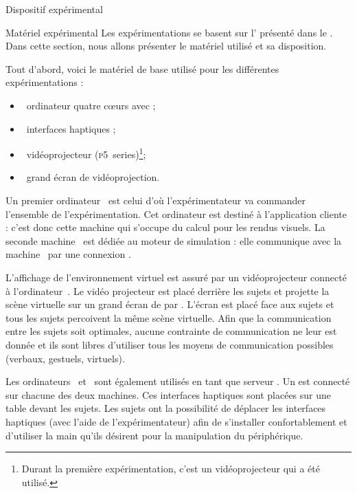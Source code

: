 \documentclass[myfrancais]{mythesis}
\begin{document}
	\myglossary
	\myappendix
	\begin{mychapter}{Dispositif expérimental}
		\begin{mysection}{Matériel expérimental}
			Les expérimentations se basent sur l' présenté dans le .
			Dans cette section, nous allons présenter le matériel utilisé et sa disposition.

			Tout d'abord, voici le matériel de base utilisé pour les différentes expérimentations :
			\begin{itemize}
				\item {}~ordinateur quatre cœurs \myIntelCore avec ;
				\item {}~interfaces haptiques \myOmni;
				\item {}~vidéoprojecteur \myACER (\textsc{p5}~series)\footnote{Durant la première expérimentation, c'est un vidéoprojecteur \myCasioXJ qui a été utilisé.};
				\item {}~grand écran de vidéoprojection.
			\end{itemize}

			Un premier ordinateur~ est celui d'où l'expérimentateur va commander l'ensemble de l'expérimentation.
			Cet ordinateur est destiné à l'application cliente  : c'est donc cette machine qui s'occupe du calcul pour les rendus visuels.
			La seconde machine~ est dédiée au moteur de simulation  : elle communique avec la machine~ par une connexion \myTCPIP.

			L'affichage de l'environnement virtuel est assuré par un vidéoprojecteur connecté à l'ordinateur~.
			Le vidéo projecteur est placé derrière les sujets et projette la scène virtuelle sur un grand écran de  par .
			L'écran est placé face aux sujets et tous les sujets percoivent la même scène virtuelle.
			Afin que la communication entre les sujets soit optimales, aucune contrainte de communication ne leur est donnée et ils sont libres d'utiliser tous les moyens de communication possibles (verbaux, gestuels, virtuels\myetc).

			Les ordinateurs~ et~ sont également utilisés en tant que serveur .
			Un \myOmni est connecté sur chacune des deux machines.
			Ces interfaces haptiques sont placées sur une table devant les sujets.
			Les sujets ont la possibilité de déplacer les interfaces haptiques (avec l'aide de l'expérimentateur) afin de s'installer confortablement et d'utiliser la main qu'ils désirent pour la manipulation du périphérique.


\end{mysection}
\end{mychapter}
\end{document}
